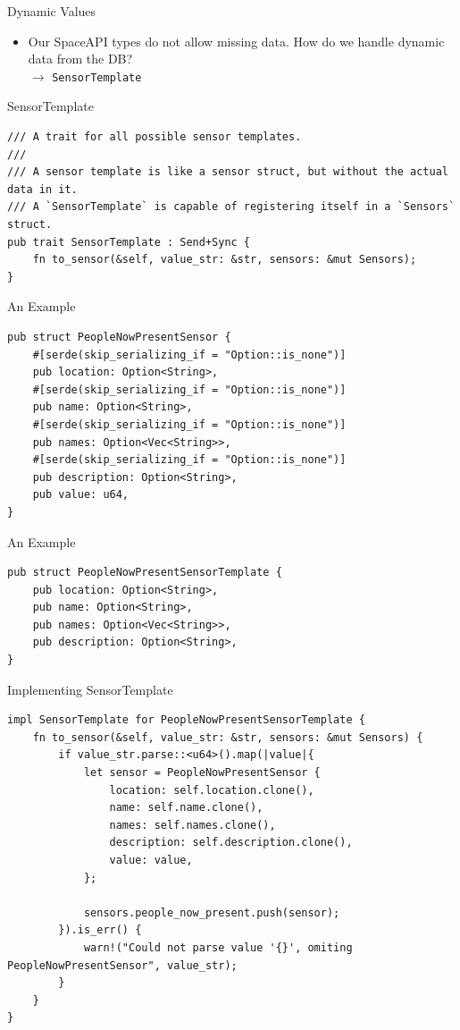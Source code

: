\begin{frame}[c]{Dynamic Values}
    \begin{itemize}
        \item Our SpaceAPI types do not allow missing data.  How do we handle
            dynamic data from the DB? \\
            \pause $\rightarrow$ \texttt{SensorTemplate}
    \end{itemize}
\end{frame}

\begin{frame}[fragile]{SensorTemplate}
    \begin{verbatim}
/// A trait for all possible sensor templates.
///
/// A sensor template is like a sensor struct, but without the actual data in it.
/// A `SensorTemplate` is capable of registering itself in a `Sensors` struct.
pub trait SensorTemplate : Send+Sync {
    fn to_sensor(&self, value_str: &str, sensors: &mut Sensors);
}
    \end{verbatim}
\end{frame}

\begin{frame}[fragile]{An Example}
    \begin{verbatim}
pub struct PeopleNowPresentSensor {
    #[serde(skip_serializing_if = "Option::is_none")]
    pub location: Option<String>,
    #[serde(skip_serializing_if = "Option::is_none")]
    pub name: Option<String>,
    #[serde(skip_serializing_if = "Option::is_none")]
    pub names: Option<Vec<String>>,
    #[serde(skip_serializing_if = "Option::is_none")]
    pub description: Option<String>,
    pub value: u64,
}
    \end{verbatim}
\end{frame}

\begin{frame}[fragile]{An Example}
    \begin{verbatim}
pub struct PeopleNowPresentSensorTemplate {
    pub location: Option<String>,
    pub name: Option<String>,
    pub names: Option<Vec<String>>,
    pub description: Option<String>,
}
    \end{verbatim}
\end{frame}


\begin{frame}[fragile]{Implementing SensorTemplate}
    \begin{verbatim}
impl SensorTemplate for PeopleNowPresentSensorTemplate {
    fn to_sensor(&self, value_str: &str, sensors: &mut Sensors) {
        if value_str.parse::<u64>().map(|value|{
            let sensor = PeopleNowPresentSensor {
                location: self.location.clone(),
                name: self.name.clone(),
                names: self.names.clone(),
                description: self.description.clone(),
                value: value,
            };

            sensors.people_now_present.push(sensor);
        }).is_err() {
            warn!("Could not parse value '{}', omiting PeopleNowPresentSensor", value_str);
        }
    }
}
    \end{verbatim}
\end{frame}


